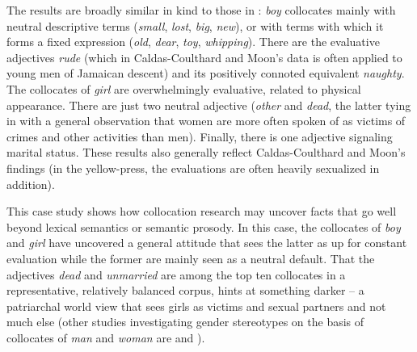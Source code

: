 The results are broadly similar in kind to those in \citet{caldas-coulthard_curvy_2010}: \textit{boy} collocates  mainly with neutral descriptive terms (\textit{small}, \textit{lost}, \textit{big}, \textit{new}), or with terms with which it forms a fixed expression (\textit{old}, \textit{dear}, \textit{toy}, \textit{whipping}). There are the evaluative adjectives  \textit{rude} (which in Caldas\hyp{}Coulthard and Moon's data is often applied to young men of Jamaican descent) and its positively connoted  equivalent \textit{naughty}.  The collocates  of \textit{girl} are overwhelmingly evaluative, related to physical appearance. There are just two neutral adjective  (\textit{other} and \textit{dead}, the latter tying in with a general observation that women are more often spoken of as victims of crimes and other activities than men). Finally, there is one adjective  signaling marital status. These results also generally reflect Caldas\hyp{}Coulthard and Moon's findings (in the yellow\hyp{}press, the evaluations are often heavily sexualized in addition).

This case study shows how collocation  research may uncover facts that go well beyond lexical semantics  or semantic prosody. In this case, the collocates of \textit{boy} and \textit{girl} have uncovered a general attitude that sees the latter as up for constant evaluation while the former are mainly seen as a neutral default.  That the adjectives  \textit{dead} and \textit{unmarried} are among the top ten collocates  in a representative,  relatively balanced corpus, hints at something darker -- a patriarchal world view that sees girls as victims and sexual partners and not much else (other studies investigating gender stereotypes on the basis of collocates of \textit{man} and \textit{woman} are \citet{gesuato_company_2003} and \citet{pearce_investigating_2008}).

